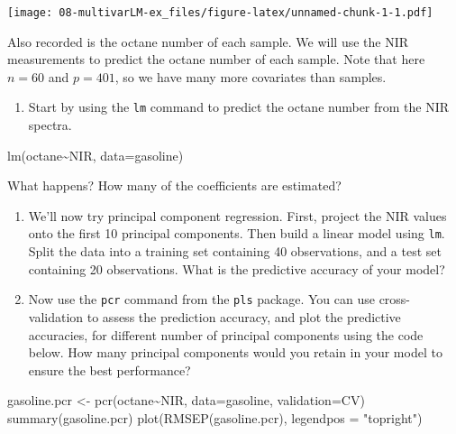 \documentclass[
]{book}
\newenvironment{Shaded}{\begin{snugshade}}{\end{snugshade}}
\newcommand{\AttributeTok}[1]{\textcolor[rgb]{0.77,0.63,0.00}{#1}}
\newcommand{\FunctionTok}[1]{\textcolor[rgb]{0.00,0.00,0.00}{#1}}
\newcommand{\NormalTok}[1]{#1}
\newcommand{\OtherTok}[1]{\textcolor[rgb]{0.56,0.35,0.01}{#1}}
\newcommand{\SpecialCharTok}[1]{\textcolor[rgb]{0.00,0.00,0.00}{#1}}
\newcommand{\StringTok}[1]{\textcolor[rgb]{0.31,0.60,0.02}{#1}}
\providecommand{\tightlist}{%
  \setlength{\itemsep}{0pt}\setlength{\parskip}{0pt}}
\theoremstyle{definition}
\theoremstyle{definition}
\theoremstyle{definition}
\theoremstyle{definition}
\theoremstyle{remark}
\begin{document}
\texttt{[image: 08-multivarLM-ex\_files/figure-latex/unnamed-chunk-1-1.pdf]}

Also recorded is the octane number of each sample. We will use the NIR measurements to predict the octane number of each sample.
Note that here \(n=60\) and \(p=401\), so we have many more covariates than samples.

\begin{enumerate}
\def\labelenumi{\roman{enumi}.}
\tightlist
\item
  Start by using the \texttt{lm} command to predict the octane number from the NIR spectra.
\end{enumerate}

\begin{Shaded}
\begin{Highlighting}[]
\FunctionTok{lm}\NormalTok{(octane}\SpecialCharTok{\textasciitilde{}}\NormalTok{NIR, }\AttributeTok{data=}\NormalTok{gasoline)}
\end{Highlighting}
\end{Shaded}

What happens? How many of the coefficients are estimated?

\begin{enumerate}
\def\labelenumi{\roman{enumi}.}
\setcounter{enumi}{1}
\item
  We'll now try principal component regression. First, project the NIR values onto the first 10 principal components. Then build a linear model using \texttt{lm}. Split the data into a training set containing 40 observations, and a test set containing 20 observations. What is the predictive accuracy of your model?
\item
  Now use the \texttt{pcr} command from the \texttt{pls} package. You can use cross-validation to assess the prediction accuracy, and plot the predictive accuracies, for different number of principal components using the code below.
  How many principal components would you retain in your model to ensure the best performance?
\end{enumerate}

\begin{Shaded}
\begin{Highlighting}[]
\NormalTok{gasoline.pcr }\OtherTok{\textless{}{-}} \FunctionTok{pcr}\NormalTok{(octane}\SpecialCharTok{\textasciitilde{}}\NormalTok{NIR, }\AttributeTok{data=}\NormalTok{gasoline, }\AttributeTok{validation=}\StringTok{\textquotesingle{}CV\textquotesingle{}}\NormalTok{)}
\FunctionTok{summary}\NormalTok{(gasoline.pcr)}
\FunctionTok{plot}\NormalTok{(}\FunctionTok{RMSEP}\NormalTok{(gasoline.pcr), }\AttributeTok{legendpos =} \StringTok{"topright"}\NormalTok{)}
\end{Highlighting}
\end{Shaded}
\end{document}
